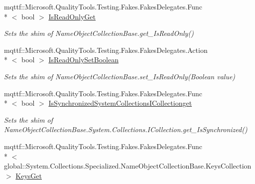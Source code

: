 \begin{DoxyCompactItemize}
mqttf\-::\-Microsoft.\-Quality\-Tools.\-Testing.\-Fakes.\-Fakes\-Delegates.\-Func\\*
$<$ bool $>$ \hyperlink{class_system_1_1_collections_1_1_specialized_1_1_fakes_1_1_shim_name_object_collection_base_a0783d303994e7dce6e7e2a78ddae2ff7}{Is\-Read\-Only\-Get}
\begin{DoxyCompactList}\small\item\em Sets the shim of Name\-Object\-Collection\-Base.\-get\-\_\-\-Is\-Read\-Only()\end{DoxyCompactList}\item 
mqttf\-::\-Microsoft.\-Quality\-Tools.\-Testing.\-Fakes.\-Fakes\-Delegates.\-Action\\*
$<$ bool $>$ \hyperlink{class_system_1_1_collections_1_1_specialized_1_1_fakes_1_1_shim_name_object_collection_base_ae5d9367630963bb2031f4d10fc5322be}{Is\-Read\-Only\-Set\-Boolean}
\begin{DoxyCompactList}\small\item\em Sets the shim of Name\-Object\-Collection\-Base.\-set\-\_\-\-Is\-Read\-Only(\-Boolean value)\end{DoxyCompactList}\item 
mqttf\-::\-Microsoft.\-Quality\-Tools.\-Testing.\-Fakes.\-Fakes\-Delegates.\-Func\\*
$<$ bool $>$ \hyperlink{class_system_1_1_collections_1_1_specialized_1_1_fakes_1_1_shim_name_object_collection_base_a7ce84450496354166df077b351a1d0fe}{Is\-Synchronized\-System\-Collections\-I\-Collectionget}
\begin{DoxyCompactList}\small\item\em Sets the shim of Name\-Object\-Collection\-Base.\-System.\-Collections.\-I\-Collection.\-get\-\_\-\-Is\-Synchronized()\end{DoxyCompactList}\item 
mqttf\-::\-Microsoft.\-Quality\-Tools.\-Testing.\-Fakes.\-Fakes\-Delegates.\-Func\\*
$<$ global\-::\-System.\-Collections.\-Specialized.\-Name\-Object\-Collection\-Base.\-Keys\-Collection $>$ \hyperlink{class_system_1_1_collections_1_1_specialized_1_1_fakes_1_1_shim_name_object_collection_base_a3183ab3cd69d15f0c9a31e26f8d69a53}{Keys\-Get}

\end{DoxyCompactItemize}
